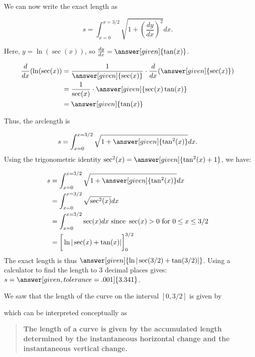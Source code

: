 \documentclass{ximera}
\begin{document}
\begin{model}
\begin{explanation}
We can now write the exact length as

\[
s = \int_{x=0}^{x=3/2} \sqrt{1+\left( \frac{dy}{dx} \right)^2} dx.
\]
 
 Here, $y= \ln( \sec(x) )$, so $ \frac{dy}{dx} = \answer[given]{\tan(x)}$.
 
 \begin{hint}
 \begin{align*}
 \frac{d}{dx}{( \ln( \sec(x) )} &= \frac{1}{\answer[given]{ \sec(x) }} \cdot \frac{d}{dx}{\left(\answer[given]{ \sec(x)}\right)}\\ 
 &= \frac{1}{ \sec(x) } \cdot \answer[given]{ \sec(x)\tan(x)}\\ 
 &= \answer[given]{\tan(x)}
 \end{align*}
 \end{hint}
 
 Thus, the arclength is
 
 \[
s = \int_{x=0}^{x=3/2} \sqrt{1+\answer[given]{\tan^2(x)}} dx.
\]
Using the trigonometric identity $\sec^2(x) = \answer[given]{\tan^2(x)+1}$, we have:

\begin{align*}
s &= \int_{x=0}^{x=3/2} \sqrt{1+\answer[given]{\tan^2(x)}} dx\\
&= \int_{x=0}^{x=3/2} \sqrt{\sec^2(x)} dx \\
& = \int_{x=0}^{x=3/2} \sec(x) dx \textrm{ since } \sec(x) > 0 \textrm{ for } 0\leq x\leq 3/2 \\
&= \bigg[\ln|\sec(x) + \tan(x)|\bigg]_0^{3/2}  
\end{align*}
The exact length is thus $\answer[given]{\ln|\sec(3/2) +
  \tan(3/2)|}$. Using a calculator to find the length to $3$ decimal
places gives: $s = \answer[given,tolerance=.001]{3.341}$.
\end{explanation}
\end{model}



\begin{remark}
We saw that the length of the curve on the interval $[0,3/2]$ is given by
\begin{image}
\end{image}
which can be interpreted conceptually as 
\begin{quote}
  \textbf{The length of a curve is given by the
    \textcolor{green!70!black!70!blue}{accumulated}
    \textcolor{purple!50!blue!90!black}{length determined by the
      instantaneous horizontal change and the instantaneous vertical
      change}.}
\end{quote}
\end{remark}
\end{document}
